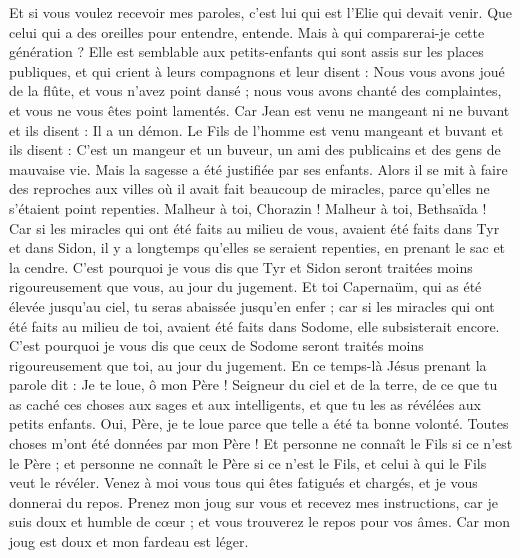 \begin{multicols}{2}
Et si vous voulez recevoir mes paroles, c'est lui qui est l'Elie{} qui devait venir.
Que celui qui a des oreilles pour entendre, entende.
Mais à qui comparerai-je cette génération ? Elle est semblable aux petits-enfants qui sont assis sur les places publiques, et qui crient à leurs compagnons
et leur disent : Nous vous avons joué de la flûte, et vous n'avez point dansé ; nous vous avons chanté des complaintes, et vous ne vous êtes point lamentés.
Car Jean est venu ne mangeant ni ne buvant et ils disent : Il a un démon.
Le Fils de l'homme est venu mangeant et buvant et ils disent : C’est un mangeur et un buveur, un ami des publicains et des gens de mauvaise vie. Mais la sagesse a été justifiée par ses enfants.
Alors il se mit à faire des reproches aux villes où il avait fait beaucoup de miracles, parce qu’elles ne s'étaient point repenties.
Malheur à toi, Chorazin ! Malheur à toi, Bethsaïda ! Car si les miracles qui ont été faits au milieu de vous, avaient été faits dans Tyr et dans Sidon, il y a longtemps qu'elles se seraient repenties, en prenant le sac et la cendre.
C'est pourquoi je vous dis que Tyr et Sidon seront traitées moins rigoureusement que vous, au jour du jugement.
Et toi Capernaüm, qui as été élevée jusqu’au ciel, tu seras abaissée jusqu’en enfer ; car si les miracles qui ont été faits au milieu de toi, avaient été faits dans Sodome, elle subsisterait encore.
C'est pourquoi je vous dis que ceux de Sodome seront traités moins rigoureusement que toi, au jour du jugement.
En ce temps-là Jésus prenant la parole dit : Je te loue, ô mon Père ! Seigneur du ciel et de la terre, de ce que tu as caché ces choses aux sages et aux intelligents, et que tu les as révélées aux petits enfants.
Oui, Père, je te loue parce que telle a été ta bonne volonté.
Toutes choses m'ont été données par mon Père ! Et personne ne connaît le Fils si ce n’est le Père ; et personne ne connaît le Père si ce n’est le Fils, et celui à qui le Fils veut le révéler.
Venez à moi vous tous qui êtes fatigués et chargés, et je vous donnerai du repos.
Prenez mon joug sur vous et recevez mes instructions, car je suis doux et humble de cœur ; et vous trouverez le repos pour vos âmes.
Car mon joug est doux et mon fardeau est léger.

\end{multicols}
